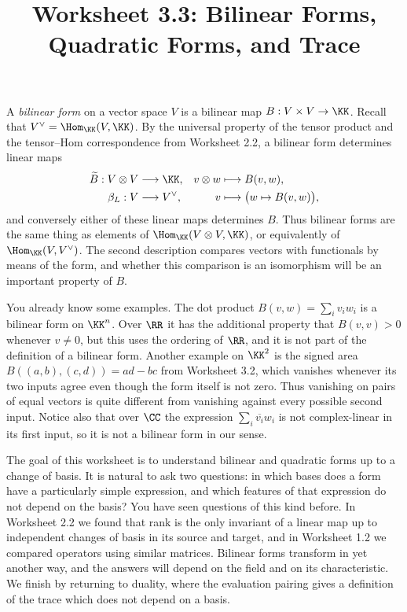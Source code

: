 \documentclass[12pt,reqno]{amsart}
\title{Worksheet 3.3: Bilinear Forms, Quadratic Forms, and Trace}
\begin{document}
\maketitle
\thispagestyle{firstpage}

A \emph{bilinear form} on a vector space $V$ is a bilinear map $B:V\times V\to\KK$. Recall that $V^{\vee}=\Hom_{\KK}(V,\KK)$. By the universal property of the tensor product and the tensor--Hom correspondence from Worksheet 2.2, a bilinear form determines linear maps
\[
\begin{aligned}
\widetilde B:V\otimes V&\longrightarrow\KK,&v\otimes w&\longmapsto B(v,w),\\
\beta_L:V&\longrightarrow V^{\vee},&v&\longmapsto\bigl(w\mapsto B(v,w)\bigr),
\end{aligned}
\]
and conversely either of these linear maps determines $B$. Thus bilinear forms are the same thing as elements of $\Hom_{\KK}(V\otimes V,\KK)$, or equivalently of $\Hom_{\KK}(V,V^{\vee})$. The second description compares vectors with functionals by means of the form, and whether this comparison is an isomorphism will be an important property of $B$.

You already know some examples. The dot product $B(v,w)=\sum_iv_iw_i$ is a bilinear form on $\KK^n$. Over $\RR$ it has the additional property that $B(v,v)>0$ whenever $v\ne0$, but this uses the ordering of $\RR$, and it is not part of the definition of a bilinear form. Another example on $\KK^2$ is the signed area $B((a,b),(c,d))=ad-bc$ from Worksheet 3.2, which vanishes whenever its two inputs agree even though the form itself is not zero. Thus vanishing on pairs of equal vectors is quite different from vanishing against every possible second input. Notice also that over $\CC$ the expression $\sum_i\overline{v_i}w_i$ is not complex-linear in its first input, so it is not a bilinear form in our sense.

The goal of this worksheet is to understand bilinear and quadratic forms up to a change of basis. It is natural to ask two questions: in which bases does a form have a particularly simple expression, and which features of that expression do not depend on the basis? You have seen questions of this kind before. In Worksheet 2.2 we found that rank is the only invariant of a linear map up to independent changes of basis in its source and target, and in Worksheet 1.2 we compared operators using similar matrices. Bilinear forms transform in yet another way, and the answers will depend on the field and on its characteristic. We finish by returning to duality, where the evaluation pairing gives a definition of the trace which does not depend on a basis.
\end{document}
